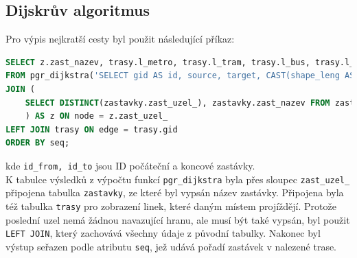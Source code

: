 \documentclass[a4paper, 12pt]{article}
\begin{document}
\subsection{Dijskrův algoritmus}
Pro výpis nejkratší cesty byl použit následující příkaz:
\begin{lstlisting}[language=SQL]
SELECT z.zast_nazev, trasy.l_metro, trasy.l_tram, trasy.l_bus, trasy.l_lan, trasy.l_vlak, trasy.l_lod, node
FROM pgr_dijkstra('SELECT gid AS id, source, target, CAST(shape_leng AS REAL) AS cost FROM trasy', id_from, id_to)
JOIN (
	SELECT DISTINCT(zastavky.zast_uzel_), zastavky.zast_nazev FROM zastavky
	) AS z ON node = z.zast_uzel_
LEFT JOIN trasy ON edge = trasy.gid 
ORDER BY seq;
\end{lstlisting}
kde \texttt{id\_from, id\_to} jsou ID počáteční a koncové zastávky. \\
K tabulce výsledků z výpočtu funkcí \texttt{pgr\_dijkstra} byla přes sloupec \texttt{zast\_uzel\_} připojena tabulka \texttt{zastavky}, ze které byl vypsán název zastávky. Připojena byla též tabulka \texttt{trasy} pro zobrazení linek, které daným místem projíždějí. Protože poslední uzel nemá žádnou navazující hranu, ale musí být také vypsán, byl použit \texttt{LEFT JOIN}, který zachovává všechny údaje z původní tabulky. Nakonec byl výstup seřazen podle atributu \texttt{seq}, jež udává pořadí zastávek v nalezené trase.
\newpage
\end{document}
